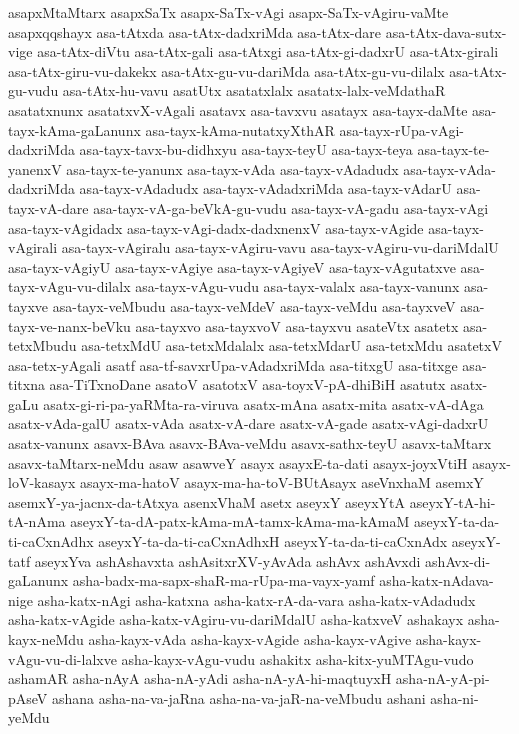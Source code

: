 {asapxMtaMtarx
asapxSaTx
asapx-SaTx-vAgi
asapx-SaTx-vAgiru-vaMte
asapxqqshayx
asa-tAtxda
asa-tAtx-dadxriMda
asa-tAtx-dare
asa-tAtx-dava-sutx-vige
asa-tAtx-diVtu
asa-tAtx-gali
asa-tAtxgi
asa-tAtx-gi-dadxrU
asa-tAtx-girali
asa-tAtx-giru-vu-dakekx
asa-tAtx-gu-vu-dariMda
asa-tAtx-gu-vu-dilalx
asa-tAtx-gu-vudu
asa-tAtx-hu-vavu
asatUtx
asatatxlalx
asatatx-lalx-veMdathaR
asatatxnunx
asatatxvX-vAgali
asatavx
asa-tavxvu
asatayx
asa-tayx-daMte
asa-tayx-kAma-gaLanunx
asa-tayx-kAma-nutatxyXthAR
asa-tayx-rUpa-vAgi-dadxriMda
asa-tayx-tavx-bu-didhxyu
asa-tayx-teyU
asa-tayx-teya
asa-tayx-te-yanenxV
asa-tayx-te-yanunx
asa-tayx-vAda
asa-tayx-vAdadudx
asa-tayx-vAda-dadxriMda
asa-tayx-vAdadudx
asa-tayx-vAdadxriMda
asa-tayx-vAdarU
asa-tayx-vA-dare
asa-tayx-vA-ga-beVkA-gu-vudu
asa-tayx-vA-gadu
asa-tayx-vAgi
asa-tayx-vAgidadx
asa-tayx-vAgi-dadx-dadxnenxV
asa-tayx-vAgide
asa-tayx-vAgirali
asa-tayx-vAgiralu
asa-tayx-vAgiru-vavu
asa-tayx-vAgiru-vu-dariMdalU
asa-tayx-vAgiyU
asa-tayx-vAgiye
asa-tayx-vAgiyeV
asa-tayx-vAgutatxve
asa-tayx-vAgu-vu-dilalx
asa-tayx-vAgu-vudu
asa-tayx-valalx
asa-tayx-vanunx
asa-tayxve
asa-tayx-veMbudu
asa-tayx-veMdeV
asa-tayx-veMdu
asa-tayxveV
asa-tayx-ve-nanx-beVku
asa-tayxvo
asa-tayxvoV
asa-tayxvu
asateVtx
asatetx
asa-tetxMbudu
asa-tetxMdU
asa-tetxMdalalx
asa-tetxMdarU
asa-tetxMdu
asatetxV
asa-tetx-yAgali
asatf
asa-tf-savxrUpa-vAdadxriMda
asa-titxgU
asa-titxge
asa-titxna
asa-TiTxnoDane
asatoV
asatotxV
asa-toyxV-pA-dhiBiH
asatutx
asatx-gaLu
asatx-gi-ri-pa-yaRMta-ra-viruva
asatx-mAna
asatx-mita
asatx-vA-dAga
asatx-vAda-galU
asatx-vAda
asatx-vA-dare
asatx-vA-gade
asatx-vAgi-dadxrU
asatx-vanunx
asavx-BAva
asavx-BAva-veMdu
asavx-sathx-teyU
asavx-taMtarx
asavx-taMtarx-neMdu
asaw
asawveY
asayx
asayxE-ta-dati
asayx-joyxVtiH
asayx-loV-kasayx
asayx-ma-hatoV
asayx-ma-ha-toV-BUtAsayx
aseVnxhaM
asemxY
asemxY-ya-jacnx-da-tAtxya
asenxVhaM
asetx
aseyxY
aseyxYtA
aseyxY-tA-hi-tA-nAma
aseyxY-ta-dA-patx-kAma-mA-tamx-kAma-ma-kAmaM
aseyxY-ta-da-ti-caCxnAdhx
aseyxY-ta-da-ti-caCxnAdhxH
aseyxY-ta-da-ti-caCxnAdx
aseyxY-tatf
aseyxYva
ashAshavxta
ashAsitxrXV-yAvAda
ashAvx
ashAvxdi
ashAvx-di-gaLanunx
asha-badx-ma-sapx-shaR-ma-rUpa-ma-vayx-yamf
asha-katx-nAdava-nige
asha-katx-nAgi
asha-katxna
asha-katx-rA-da-vara
asha-katx-vAdadudx
asha-katx-vAgide
asha-katx-vAgiru-vu-dariMdalU
asha-katxveV
ashakayx
asha-kayx-neMdu
asha-kayx-vAda
asha-kayx-vAgide
asha-kayx-vAgive
asha-kayx-vAgu-vu-di-lalxve
asha-kayx-vAgu-vudu
ashakitx
asha-kitx-yuMTAgu-vudo
ashamAR
asha-nAyA
asha-nA-yAdi
asha-nA-yA-hi-maqtuyxH
asha-nA-yA-pi-pAseV
ashana
asha-na-va-jaRna
asha-na-va-jaR-na-veMbudu
ashani
asha-ni-yeMdu
}
